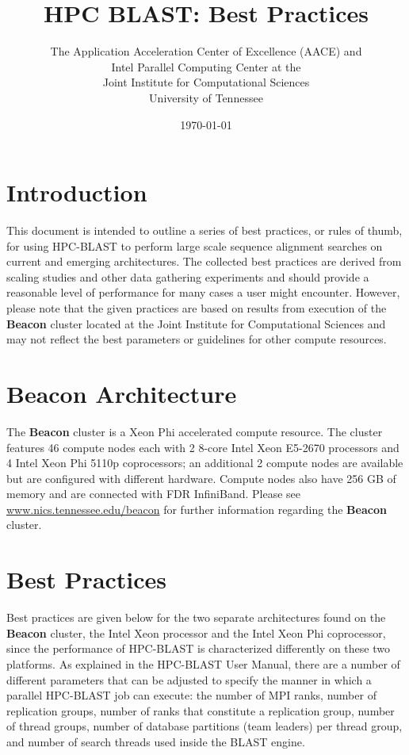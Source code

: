 \documentclass[10pt]{article}
\newcommand{\beac}{\textbf{Beacon }}
\begin{document}
\title{HPC BLAST: Best Practices\\
         }
\author{The Application Acceleration Center of Excellence (AACE) and\\
   Intel Parallel Computing Center at the\\
   Joint Institute for Computational Sciences\\University of Tennessee}

\date{\today}
\maketitle

\section{Introduction} \label{sec:intro}

This document is intended to outline a series of best practices, or rules of thumb, for using HPC-BLAST to perform large scale sequence alignment
searches on current and emerging architectures.  The collected best practices are derived from scaling studies and other data gathering experiments and
should provide a reasonable level of performance for many cases a user might encounter.  However, please note that the given practices are based on
results from execution of the \beac cluster located at the Joint Institute for Computational Sciences and may not reflect the best parameters or guidelines
for other compute resources.

\section{\beac Architecture} \label{sec:beacon-arch}

The \beac cluster is a Xeon Phi accelerated compute resource.  The cluster features 46 compute nodes each with 2 8-core Intel Xeon E5-2670 processors
and 4 Intel Xeon Phi 5110p coprocessors; an additional 2 compute nodes are available but are configured with different hardware.  Compute nodes also
have 256 GB of memory and are connected with FDR InfiniBand.  Please see \url{www.nics.tennessee.edu/beacon} for further information regarding the \beac cluster.

\section{Best Practices} \label{sec:best-prac}

Best practices are given below for the two separate architectures found on the \beac cluster, the Intel Xeon processor and the Intel Xeon Phi coprocessor,
since the performance of HPC-BLAST is characterized differently on these two platforms.  As explained
in the HPC-BLAST User Manual, there are a number of different parameters that can be adjusted to specify the manner in which a parallel HPC-BLAST job
can execute: the number of MPI ranks, number of replication groups, number of ranks that constitute a replication group, number of thread groups, number
of database partitions (team leaders) per thread group, and number of search threads used inside the BLAST engine.\\
\end{document}
